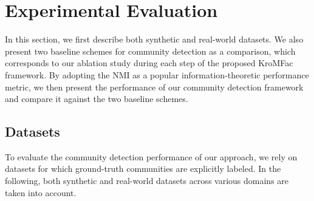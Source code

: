 \documentclass[format=acmsmall, review=false, screen=true]{acmart}
\begin{document}
\section{Experimental Evaluation}\label{sec:5}

In this section, we first describe both synthetic and real-world datasets. We also present two baseline schemes for community detection as a comparison, which corresponds to our ablation study during each step of the proposed \textsf{KroMFac} framework. By adopting the NMI as a popular information-theoretic performance metric, we then present the performance of our community detection framework and compare it against the two baseline schemes. 

\subsection{Datasets}\label{sec:5a}
To evaluate the community detection performance of our approach, we rely on datasets for which ground-truth communities are explicitly labeled. In the following, both synthetic and real-world datasets across various domains are taken into account.
\end{document}
